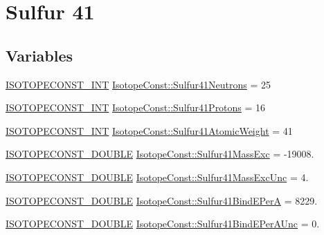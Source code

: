 \hypertarget{group___isotope_const-_sulfur-_s41}{}\section{Sulfur 41}
\label{group___isotope_const-_sulfur-_s41}
\subsection*{Variables}
\begin{DoxyCompactItemize}
\item 
\mbox{\hyperlink{group___isotope_const-_macros_ga5f18360b3e99483a35c32d789e62621c}{I\+S\+O\+T\+O\+P\+E\+C\+O\+N\+S\+T\+\_\+\+I\+NT}} \mbox{\hyperlink{group___isotope_const-_sulfur-_s41_gae5d696203995181c92c7dae4938d9af2}{Isotope\+Const\+::\+Sulfur41\+Neutrons}} = 25
\item 
\mbox{\hyperlink{group___isotope_const-_macros_ga5f18360b3e99483a35c32d789e62621c}{I\+S\+O\+T\+O\+P\+E\+C\+O\+N\+S\+T\+\_\+\+I\+NT}} \mbox{\hyperlink{group___isotope_const-_sulfur-_s41_ga4f26bdd9dee8cb2270e55e1d543e63ca}{Isotope\+Const\+::\+Sulfur41\+Protons}} = 16
\item 
\mbox{\hyperlink{group___isotope_const-_macros_ga5f18360b3e99483a35c32d789e62621c}{I\+S\+O\+T\+O\+P\+E\+C\+O\+N\+S\+T\+\_\+\+I\+NT}} \mbox{\hyperlink{group___isotope_const-_sulfur-_s41_ga0c117d8787394d460b2f3bfc7311d639}{Isotope\+Const\+::\+Sulfur41\+Atomic\+Weight}} = 41
\item 
\mbox{\hyperlink{group___isotope_const-_macros_ga8f45a7272ce02c0b4c65c44636ed719a}{I\+S\+O\+T\+O\+P\+E\+C\+O\+N\+S\+T\+\_\+\+D\+O\+U\+B\+LE}} \mbox{\hyperlink{group___isotope_const-_sulfur-_s41_gadb4bc2e057d60a372e3c3f094db99c5a}{Isotope\+Const\+::\+Sulfur41\+Mass\+Exc}} = -\/19008.
\item 
\mbox{\hyperlink{group___isotope_const-_macros_ga8f45a7272ce02c0b4c65c44636ed719a}{I\+S\+O\+T\+O\+P\+E\+C\+O\+N\+S\+T\+\_\+\+D\+O\+U\+B\+LE}} \mbox{\hyperlink{group___isotope_const-_sulfur-_s41_ga052631b7533b4194d71554885c462443}{Isotope\+Const\+::\+Sulfur41\+Mass\+Exc\+Unc}} = 4.
\item 
\mbox{\hyperlink{group___isotope_const-_macros_ga8f45a7272ce02c0b4c65c44636ed719a}{I\+S\+O\+T\+O\+P\+E\+C\+O\+N\+S\+T\+\_\+\+D\+O\+U\+B\+LE}} \mbox{\hyperlink{group___isotope_const-_sulfur-_s41_ga3bc877c7556a06764453332d94be2fe7}{Isotope\+Const\+::\+Sulfur41\+Bind\+E\+PerA}} = 8229.
\item 
\mbox{\hyperlink{group___isotope_const-_macros_ga8f45a7272ce02c0b4c65c44636ed719a}{I\+S\+O\+T\+O\+P\+E\+C\+O\+N\+S\+T\+\_\+\+D\+O\+U\+B\+LE}} \mbox{\hyperlink{group___isotope_const-_sulfur-_s41_ga5e3835c09c48398e45507c51d2577642}{Isotope\+Const\+::\+Sulfur41\+Bind\+E\+Per\+A\+Unc}} = 0.

\end{DoxyCompactItemize}
